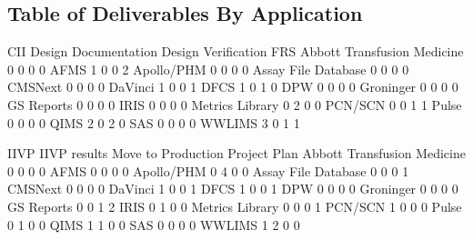 \documentclass{article}
\begin{document}
\subsection{Table of Deliverables By Application}
\begin{Schunk}
\begin{Soutput}
                              CII Design Documentation Design Verification FRS
  Abbott Transfusion Medicine   0                    0                   0   0
  AFMS                          1                    0                   0   2
  Apollo/PHM                    0                    0                   0   0
  Assay File Database           0                    0                   0   0
  CMSNext                       0                    0                   0   0
  DaVinci                       1                    0                   0   1
  DFCS                          1                    0                   1   0
  DPW                           0                    0                   0   0
  Groninger                     0                    0                   0   0
  GS Reports                    0                    0                   0   0
  IRIS                          0                    0                   0   0
  Metrics Library               0                    2                   0   0
  PCN/SCN                       0                    0                   1   1
  Pulse                         0                    0                   0   0
  QIMS                          2                    0                   2   0
  SAS                           0                    0                   0   0
  WWLIMS                        3                    0                   1   1
                             
                              IIVP IIVP results Move to Production Project Plan
  Abbott Transfusion Medicine    0            0                  0            0
  AFMS                           0            0                  0            0
  Apollo/PHM                     0            4                  0            0
  Assay File Database            0            0                  0            1
  CMSNext                        0            0                  0            0
  DaVinci                        1            0                  0            1
  DFCS                           1            0                  0            1
  DPW                            0            0                  0            0
  Groninger                      0            0                  0            0
  GS Reports                     0            0                  1            2
  IRIS                           0            1                  0            0
  Metrics Library                0            0                  0            1
  PCN/SCN                        1            0                  0            0
  Pulse                          0            1                  0            0
  QIMS                           1            1                  0            0
  SAS                            0            0                  0            0
  WWLIMS                         1            2                  0            0
                             

\end{Soutput}
\end{Schunk}
\end{document}

